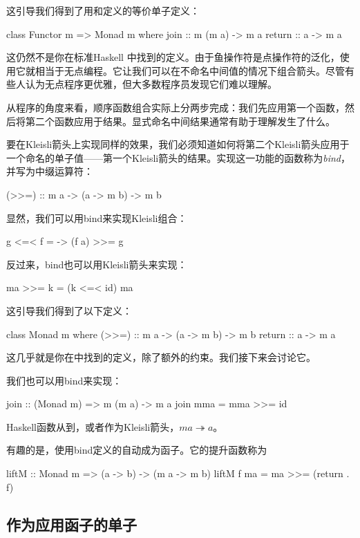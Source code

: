 \documentclass[DaoFP]{subfiles}
\begin{document}
这引导我们得到了用和定义的等价单子定义：
\begin{haskell}
class Functor m => Monad m where
  join :: m (m a) -> m a
  return :: a -> m a
\end{haskell}

这仍然不是你在标准Haskell 中找到的定义。由于鱼操作符是点操作符的泛化，使用它就相当于无点编程。它让我们可以在不命名中间值的情况下组合箭头。尽管有些人认为无点程序更优雅，但大多数程序员发现它们难以理解。

从程序的角度来看，顺序函数组合实际上分两步完成：我们先应用第一个函数，然后将第二个函数应用于结果。显式命名中间结果通常有助于理解发生了什么。

要在Kleisli箭头上实现同样的效果，我们必须知道如何将第二个Kleisli箭头应用于一个命名的单子值——第一个Kleisli箭头的结果。实现这一功能的函数称为\emph{bind}，并写为中缀运算符：
\begin{haskell}
(>>=) :: m a -> (a -> m b) -> m b
\end{haskell}
显然，我们可以用bind来实现Kleisli组合：

\begin{haskell}
g <=< f = \a -> (f a) >>= g
\end{haskell}

反过来，bind也可以用Kleisli箭头来实现：
\begin{haskell}
ma >>= k = (k <=< id) ma
\end{haskell}

这引导我们得到了以下定义：
\begin{haskell}
class Monad m where
  (>>=) :: m a -> (a -> m b) -> m b
  return :: a -> m a 
\end{haskell}
这几乎就是你在中找到的定义，除了额外的约束。我们接下来会讨论它。

我们也可以用bind来实现：
\begin{haskell}
join  :: (Monad m) => m (m a) -> m a
join mma =  mma >>= id
\end{haskell}
Haskell函数从到，或者作为Kleisli箭头，$m a \twoheadrightarrow a$。

有趣的是，使用bind定义的自动成为函子。它的提升函数称为
\begin{haskell}
liftM :: Monad m => (a -> b) -> (m a -> m b)
liftM f ma = ma >>= (return . f)
\end{haskell}

\subsection{作为应用函子的单子}
\end{document}
